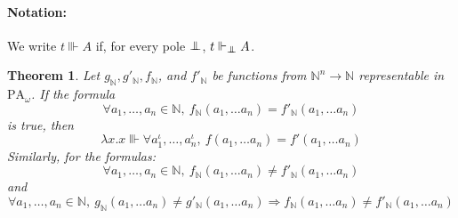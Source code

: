 \documentclass[a4paper,12pt]{article}
\newtheorem{theo}{Theorem}[subsection]
\theoremstyle{rmqstyle}
\newcommand{\N}{\mathbb{N}}
\newcommand{\PA}{\mathrm{PA}}
\renewcommand{\implies}{\Rightarrow}
\newcommand{\pole}{{\protect\mathpalette{\protect\polehelper}{\bot}}} \def\polehelper#1#2{\mathrel{\rlap{$#1#2$}\mkern3mu{#1#2}}}
\begin{document}
\paragraph{Notation:} We write $t \Vvdash A$ if, for every pole $\pole$, $t \Vdash_\pole A$.

\begin{theo}
\label{T1}
Let $g_\N, g'_\N, f_\N$, and $f'_\N$ be functions from $\N^n \to \N$ representable in $\PA_\omega$. If the formula
$$\forall a_1, \dots, a_n \in \N, \ f_\N(a_1, \dots a_n) = f'_\N (a_1, \dots a_n)$$
is true, then
$$\lambda x.x \Vvdash \forall a_1^\iota, \dots, a_n^\iota, \ f(a_1, \dots a_n) = f'(a_1, \dots a_n)$$
Similarly, for the formulas:
$$\forall a_1, \dots, a_n \in \N, \ f_\N(a_1, \dots a_n) \neq f'_\N (a_1, \dots a_n)$$
and
$$\forall a_1, \dots, a_n \in \N, \ g_\N (a_1, \dots a_n) \neq g'_\N (a_1, \dots a_n) \implies f_\N(a_1, \dots a_n) \neq f'_\N (a_1, \dots a_n)$$
\end{theo}
\end{document}
